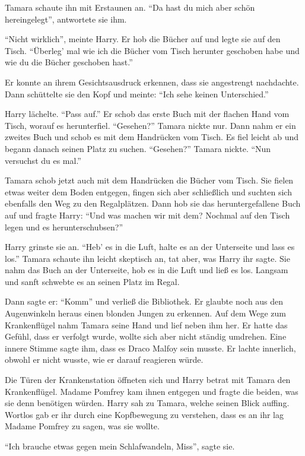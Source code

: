 Tamara schaute ihn mit Erstaunen an. \enquote{Da hast du mich aber schön hereingelegt}, antwortete sie ihm.

\enquote{Nicht wirklich}, meinte Harry. Er hob die Bücher auf und legte sie auf den Tisch. \enquote{Überleg’ mal wie ich die Bücher vom Tisch herunter geschoben habe und wie du die Bücher geschoben hast.}

Er konnte an ihrem Gesichtsausdruck erkennen, dass sie angestrengt nachdachte. Dann schüttelte sie den Kopf und meinte: \enquote{Ich sehe keinen Unterschied.}

Harry lächelte. \enquote{Pass auf.} Er schob das erste Buch mit der flachen Hand vom Tisch, worauf es herunterfiel. \enquote{Gesehen?} Tamara nickte nur. Dann nahm er ein zweites Buch und schob es mit dem Handrücken vom Tisch. Es fiel leicht ab und begann danach seinen Platz zu suchen. \enquote{Gesehen?} Tamara nickte. \enquote{Nun versuchst du es mal.}

Tamara schob jetzt auch mit dem Handrücken die Bücher vom Tisch. Sie fielen etwas weiter dem Boden entgegen, fingen sich aber schließlich und suchten sich ebenfalls den Weg zu den Regalplätzen. Dann hob sie das heruntergefallene Buch auf und fragte Harry: \enquote{Und was machen wir mit dem? Nochmal auf den Tisch legen und es herunterschubsen?}

Harry grinste sie an. \enquote{Heb’ es in die Luft, halte es an der Unterseite und lass es los.} Tamara schaute ihn leicht skeptisch an, tat aber, was Harry ihr sagte. Sie nahm das Buch an der Unterseite, hob es in die Luft und ließ es los. Langsam und sanft schwebte es an seinen Platz im Regal.

Dann sagte er: \enquote{Komm} und verließ die Bibliothek. Er glaubte noch aus den Augenwinkeln heraus einen blonden Jungen zu erkennen. Auf dem Wege zum Krankenflügel nahm Tamara seine Hand und lief neben ihm her. Er hatte das Gefühl, dass er verfolgt wurde, wollte sich aber nicht ständig umdrehen. Eine innere Stimme sagte ihm, dass es Draco Malfoy sein musste. Er lachte innerlich, obwohl er nicht wusste, wie er darauf reagieren würde.

Die Türen der Krankenstation öffneten sich und Harry betrat mit Tamara den Krankenflügel. Madame Pomfrey kam ihnen entgegen und fragte die beiden, was sie denn benötigen würden. Harry sah zu Tamara, welche seinen Blick auffing. Wortlos gab er ihr durch eine Kopfbewegung zu verstehen, dass es an ihr lag Madame Pomfrey zu sagen, was sie wollte.

\enquote{Ich brauche etwas gegen mein Schlafwandeln, Miss}, sagte sie.

